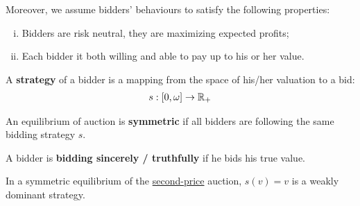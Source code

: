 \documentclass{book}
\begin{document}
	\begin{assumption}
		Moreover, we assume bidders' behaviours to satisfy the following properties:
		\begin{enumerate}[(i)]
			\item Bidders are risk neutral, they are maximizing expected profits;
			\item Each bidder it both willing and able to pay up to his or her value.
		\end{enumerate}
	\end{assumption}
	
	\begin{definition}
		A \textbf{strategy} of a bidder is a mapping from the space of his/her valuation to a bid:
		\begin{align}
			s: [0, \omega] \to \mathbb{R}_+
		\end{align}
	\end{definition}
	
	\begin{definition}
		An equilibrium of auction is \textbf{symmetric} if all bidders are following the same bidding strategy $s$.
	\end{definition}
	
	\begin{definition}
		A bidder is \textbf{bidding sincerely / truthfully} if he bids his true value. 
	\end{definition}
	
	\begin{proposition}
		In a symmetric equilibrium of the \ul{second-price} auction, $s(v) = v$ is a weakly dominant strategy.
	\end{proposition}
	
\end{document}
